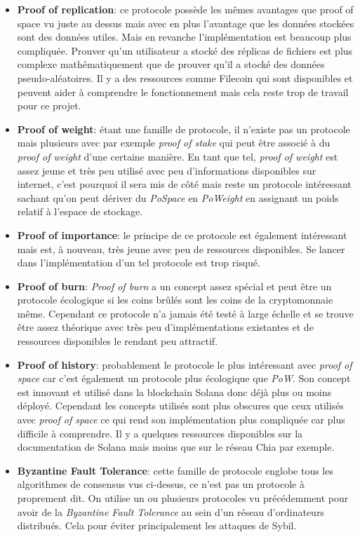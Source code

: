 \begin{itemize}
    \item \textbf{Proof of replication}: ce protocole possède les mêmes avantages que proof of space vu juste au dessus mais avec en plus l'avantage que les données stockées sont des données utiles. Mais en revanche l'implémentation est beaucoup plus compliquée. Prouver qu'un utilisateur a stocké des réplicas de fichiers est plus complexe mathématiquement que de prouver qu'il a stocké des données pseudo-aléatoires. Il y a des ressources comme Filecoin qui sont disponibles et peuvent aider à comprendre le fonctionnement mais cela reste trop de travail pour ce projet.
    \item \textbf{Proof of weight}: étant une famille de protocole, il n'existe pas un protocole mais plusieurs avec par exemple \textit{proof of stake} qui peut être associé à du \textit{proof of weight} d'une certaine manière. En tant que tel, \textit{proof of weight} est assez jeune et très peu utilisé avec peu d'informations disponibles sur internet, c'est pourquoi il sera mis de côté mais reste un protocole intéressant sachant qu'on peut dériver du \textit{PoSpace} en \textit{PoWeight} en assignant un poids relatif à l'espace de stockage.
    \item \textbf{Proof of importance}: le principe de ce protocole est également intéressant mais est, à nouveau, très jeune avec peu de ressources disponibles. Se lancer dans l'implémentation d'un tel protocole est trop risqué.
    \item \textbf{Proof of burn}: \textit{Proof of burn} a un concept assez spécial et peut être un protocole écologique si les coins brûlés sont les coins de la cryptomonnaie même. Cependant ce protocole n'a jamais été testé à large échelle et se trouve être assez théorique avec très peu d'implémentations existantes et de ressources disponibles le rendant peu attractif.
    \item \textbf{Proof of history}: probablement le protocole le plus intéressant avec \textit{proof of space} car c'est également un protocole plus écologique que \textit{PoW}. Son concept est innovant et utilisé dans la blockchain Solana donc déjà plus ou moins déployé. Cependant les concepts utilisés sont plus obscures que ceux utilisés avec \textit{proof of space} ce qui rend son implémentation plus compliquée car plus difficile à comprendre. Il y a quelques ressources disponibles sur la documentation de Solana mais moins que sur le réseau Chia par exemple.
    \item \textbf{Byzantine Fault Tolerance}: cette famille de protocole englobe tous les algorithmes de consensus vus ci-dessus, ce n'est pas un protocole à proprement dit. On utilise un ou plusieurs protocoles vu précédemment pour avoir de la \textit{Byzantine Fault Tolerance} au sein d'un réseau d'ordinateurs distribués. Cela pour éviter principalement les attaques de Sybil.
\end{itemize}

